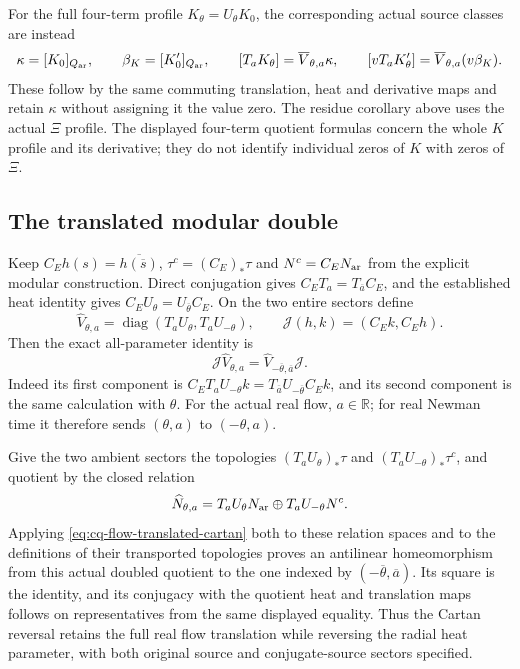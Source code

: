 For the full four-term profile $K_\theta=U_\theta K_0$, the corresponding
actual source classes are instead
\[
 \kappa=[K_0]_{Q_{\rm ar}},\qquad \beta_K=[K_0']_{Q_{\rm ar}},\qquad
 [T_aK_\theta]=\overline V_{\theta,a}\kappa,\qquad
 [vT_aK_\theta']=\overline V_{\theta,a}(v\beta_K).
\]
These follow by the same commuting translation, heat and derivative
maps and retain $\kappa$ without assigning it the value zero.
The residue corollary above uses the actual $\Xi$ profile.
The displayed four-term quotient formulas concern the whole $K$
profile and its derivative; they do not identify individual zeros
of $K$ with zeros of $\Xi$.

\subsection{The translated modular double}

Keep $C_Eh(s)=\overline{h(\overline s)}$,
$\tau^c=(C_E)_*\tau$ and $N^c=C_EN_{\rm ar}$ from the explicit modular
construction. Direct conjugation gives
$C_ET_a=T_{\overline a}C_E$, and the established heat identity gives
$C_EU_\theta=U_{\overline\theta}C_E$.
On the two entire sectors define
\[
 \widehat V_{\theta,a}
   =\operatorname{diag}(T_aU_\theta,T_aU_{-\theta}),\qquad
 \mathcal J(h,k)=(C_Ek,C_Eh).
\]
Then the exact all-parameter identity is
\begin{equation}
 \mathcal J\widehat V_{\theta,a}
 =\widehat V_{-\overline\theta,\overline a}\mathcal J .
 \label{eq:cq-flow-translated-cartan}
\end{equation}
Indeed its first component is
$C_ET_aU_{-\theta}k=T_{\overline a}U_{-\overline\theta}C_Ek$,
and its second component is the same calculation with $\theta$.
For the actual real flow, $a\in\mathbb R$; for real Newman time it
therefore sends $(\theta,a)$ to $(-\theta,a)$.

Give the two ambient sectors the topologies
$(T_aU_\theta)_*\tau$ and $(T_aU_{-\theta})_*\tau^c$, and quotient
by the closed relation
\[
 \widehat N_{\theta,a}
   =T_aU_\theta N_{\rm ar}\oplus T_aU_{-\theta}N^c .
\]
Applying \eqref{eq:cq-flow-translated-cartan} both to these relation
spaces and to the definitions of their transported topologies proves
an antilinear homeomorphism from this actual doubled quotient to
the one indexed by $(-\overline\theta,\overline a)$.
Its square is the identity, and its conjugacy with the quotient heat
and translation maps follows on representatives from the same
displayed equality. Thus the Cartan reversal retains the full real
flow translation while reversing the radial heat parameter, with
both original source and conjugate-source sectors specified.

